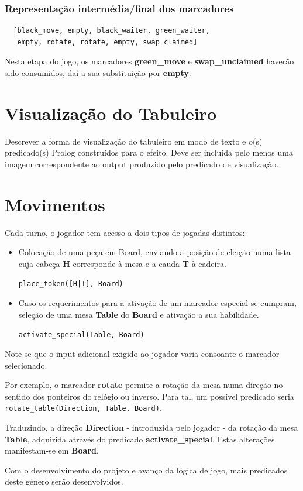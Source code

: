 \documentclass[a4paper]{article}
\begin{document}
\subsubsection{Representação intermédia/final dos marcadores}
\begin{lstlisting}
  [black_move, empty, black_waiter, green_waiter, 
   empty, rotate, rotate, empty, swap_claimed]
\end{lstlisting}

Nesta etapa do jogo, os marcadores \textbf{green\_move} e \textbf{swap\_unclaimed} haverão sido consumidos, daí a sua substituição por \textbf{empty}. \newline


\section{Visualização do Tabuleiro}

Descrever a forma de visualização do tabuleiro em modo de texto e o(s) predicado(s) Prolog construídos para o efeito.
Deve ser incluída pelo menos uma imagem correspondente ao output produzido pelo predicado de visualização.


\newpage
\section{Movimentos}

Cada turno, o jogador tem acesso a dois tipos de jogadas distintos:

\begin{itemize}
\item Colocação de uma peça em Board, enviando a posição de eleição numa lista cuja cabeça \textbf{H} corresponde à mesa e a cauda \textbf{T} à cadeira.

\texttt{place\_token([H|T], Board)}

\item Caso os requerimentos para a ativação de um marcador especial se cumpram, seleção de uma mesa \textbf{Table} do \textbf{Board} e ativação a sua habilidade.

\texttt{activate\_special(Table, Board)}
\end{itemize}

Note-se que o input adicional exigido ao jogador varia consoante o marcador selecionado. \newline

Por exemplo, o marcador \textbf{rotate} permite a rotação da mesa numa direção no sentido dos ponteiros do relógio ou inverso. Para tal, um possível predicado seria \texttt{rotate\_table(Direction, Table, Board)}. 	\newline

Traduzindo, a direção \textbf{Direction} - introduzida pelo jogador - da rotação da mesa \textbf{Table}, adquirida através do predicado \textbf{activate\_special}. Estas alterações manifestam-se em \textbf{Board}. \newline

Com o desenvolvimento do projeto e avanço da lógica de jogo, mais predicados deste género serão desenvolvidos.
\end{document}
